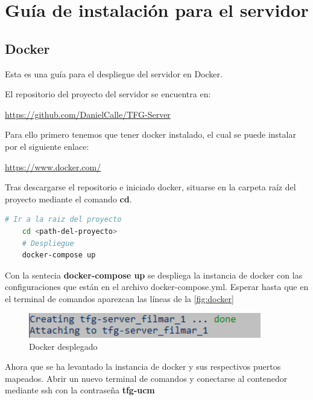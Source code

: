 
\cleardoublepage

\chapter{Guía de instalación para el servidor}
\label{app:guia_instalacion}

\section{Docker}
\label{app:docker}
Esta es una guía para el despliegue del servidor en Docker.

El repositorio del proyecto del servidor se encuentra en: 

\url{https://github.com/DanielCalle/TFG-Server}

Para ello primero tenemos que tener docker instalado, el cual 
se puede instalar por el siguiente enlace:

\url{https://www.docker.com/}

Tras descargarse el repositorio e iniciado docker, situarse en la carpeta raíz del proyecto mediante el comando \textbf{cd}.

\begin{lstlisting}[language=bash, caption=Despliegue de la instancia de docker]
    # Ir a la raiz del proyecto
    cd <path-del-proyecto> 
    # Despliegue
    docker-compose up
\end{lstlisting}

Con la sentecia \textbf{docker-compose up} se despliega la instancia de docker con las configuraciones 
que están en el archivo docker-compose.yml. Esperar hasta que en el terminal de comandos aparezcan las líneas
de la \autoref{fig:docker}

\begin{figure}[H]
    \centering
    \includegraphics[width=4in]{figures/appendix-A/docker.png}
    \caption{Docker desplegado}
    \label{fig:docker}
\end{figure}

Ahora que se ha levantado la instancia de docker y sus respectivos puertos mapeados.
Abrir un nuevo terminal de comandos y conectarse al contenedor mediante ssh con la contraseña \textbf{tfg-ucm}

